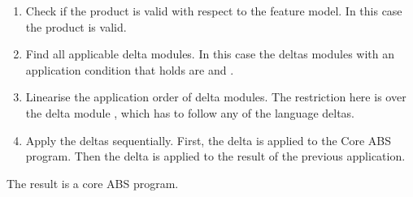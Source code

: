 \begin{enumerate}
    \item Check if the product is valid with respect to the feature model. 
    In this case the product  is valid.

    \item Find all applicable delta modules. In this case the deltas modules
    with an application condition that holds are  and
    .
  
    \item Linearise the application order of delta modules. The restriction here
    is over the delta module , which has to follow any of the
    language deltas.
  
    \item Apply the deltas sequentially. First, the  delta is applied
    to the Core ABS program. Then the  delta is applied to
    the result of the previous application.
\end{enumerate}

\noindent The result is a core ABS program.

